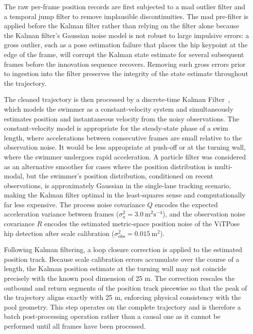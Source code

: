 The raw per-frame position records are first subjected to a \gls{mad}
outlier filter and a temporal jump filter to remove implausible discontinuities. The \gls{mad}
pre-filter is applied before the Kalman filter rather than relying on the filter alone because
the Kalman filter's Gaussian noise model is not robust to large impulsive errors: a gross
outlier, such as a pose estimation failure that places the hip keypoint at the edge of the
frame, will corrupt the Kalman state estimate for several subsequent frames before the
innovation sequence recovers. Removing such gross errors prior to ingestion into the filter
preserves the integrity of the state estimate throughout the trajectory.

The cleaned trajectory is then processed by a discrete-time Kalman Filter~\cite{kalman1960new},
which models the swimmer as a constant-velocity system and simultaneously estimates position
and instantaneous velocity from the noisy observations. The constant-velocity model is
appropriate for the steady-state phase of a swim length, where accelerations between
consecutive frames are small relative to the observation noise. It would be less appropriate
at push-off or at the turning wall, where the swimmer undergoes rapid acceleration. A particle filter was considered as an alternative smoother for
cases where the position distribution is multi-modal, but the swimmer's position distribution,
conditioned on recent observations, is approximately Gaussian in the single-lane tracking
scenario, making the Kalman filter optimal in the least-squares sense and computationally
far less expensive. The process noise covariance $Q$ encodes the expected acceleration
variance between frames ($\sigma^2_a = 3.0\ \text{m}^2\text{s}^{-4}$), and the observation
noise covariance $R$ encodes the estimated metric-space position noise of the ViTPose hip
detection after scale calibration ($\sigma^2_\text{obs} = 0.015\ \text{m}^2$).

Following Kalman filtering, a loop closure correction is applied to the estimated position
track. Because scale calibration errors accumulate over the course of a length, the Kalman
position estimate at the turning wall may not coincide precisely with the known pool dimension
of 25 m. The correction rescales the outbound and return segments of the position track
piecewise so that the peak of the trajectory aligns exactly with 25 m, enforcing physical
consistency with the pool geometry. This step operates on the complete trajectory and is
therefore a batch post-processing operation rather than a causal one as it cannot be performed
until all frames have been processed.

